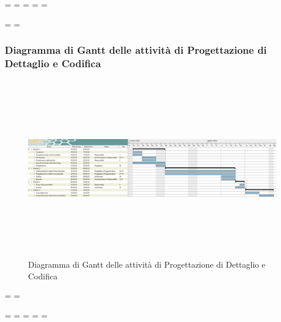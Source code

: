 \newpage
\paperwidth=\pdfpageheight
\paperheight=\pdfpagewidth
\pdfpageheight=\paperheight
\pdfpagewidth=\paperwidth
\headwidth=\textheight

\begingroup 
\vsize=\textwidth
\hsize=\textheight

\subsubsection{Diagramma di Gantt delle attività di Progettazione di Dettaglio e Codifica}
\pagestyle{empty}
\begin{figure}[h]
	\centering
	\includegraphics[height = 8cm, width = 24.5cm]{Sezioni/DiagrammiGantt/ProgettazioneDiDettaglio.png}
	\caption{Diagramma di Gantt delle attività di Progettazione di Dettaglio e Codifica}
\end{figure}

\textwidth=\hsize
\textheight=\vsize

\endgroup
\newpage
\paperwidth=\pdfpageheight
\paperheight=\pdfpagewidth
\pdfpageheight=\paperheight
\pdfpagewidth=\paperwidth
\headwidth=\textwidth